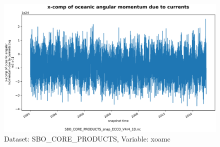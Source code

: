 \begin{figure}[H]
\centering
\includegraphics[scale=0.55]{../images/plots/oneD_plots/SBO_Core_Products/xoamc.png}
\caption{Dataset: SBO\_CORE\_PRODUCTS, Variable: xoamc}
\label{tab:table-SBO_CORE_PRODUCTS_xoamc-Plot}
\end{figure}
\newpage
\pagebreak
